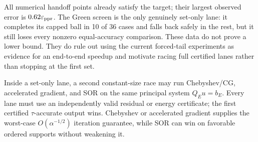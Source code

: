 All numerical handoff points already satisfy the target; their largest
observed error is $0.62\varepsilon_{\mathrm{ppr}}$.  The Green screen is the only genuinely
set-only lane: it completes its capped ball in 10 of 36 cases and falls back
safely in the rest, but it still loses every nonzero equal-accuracy
comparison.  These data do not prove a lower bound.  They do rule out using
the current forced-tail experiments as evidence for an end-to-end speedup and
motivate racing full certified lanes rather than stopping at the first set.

Inside a set-only lane, a second constant-size race may run Chebyshev/CG,
accelerated gradient, and SOR on the same principal system $Q_Eu=b_E$.
Every lane must use an independently valid residual or energy certificate;
the first certified $\tau$-accurate output wins.  Chebyshev or accelerated
gradient supplies the worst-case $O(\alpha^{-1/2})$ iteration guarantee,
while SOR can win on favorable ordered supports without weakening it.
